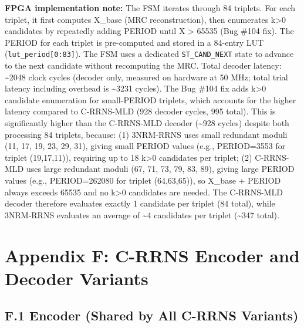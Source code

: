 \documentclass[
  12pt,
  a4paper]{report}
\begin{document}
\textbf{FPGA implementation note:} The FSM iterates through 84 triplets.
For each triplet, it first computes X\_base (MRC reconstruction), then
enumerates k\textgreater0 candidates by repeatedly adding PERIOD until X
\textgreater{} 65535 (Bug \#104 fix). The PERIOD for each triplet is
pre-computed and stored in a 84-entry LUT
(\texttt{lut\_period{[}0:83{]}}). The FSM uses a dedicated
\texttt{ST\_CAND\_NEXT} state to advance to the next candidate without
recomputing the MRC. Total decoder latency: \textasciitilde2048 clock
cycles (decoder only, measured on hardware at 50 MHz; total trial
latency including overhead is \textasciitilde3231 cycles). The Bug \#104
fix adds k\textgreater0 candidate enumeration for small-PERIOD triplets,
which accounts for the higher latency compared to C-RRNS-MLD (928
decoder cycles, 995 total). This is significantly higher than the
C-RRNS-MLD decoder (\textasciitilde928 cycles) despite both processing
84 triplets, because: (1) 3NRM-RRNS uses small redundant moduli (11, 17,
19, 23, 29, 31), giving small PERIOD values (e.g., PERIOD=3553 for
triplet (19,17,11)), requiring up to 18 k\textgreater0 candidates per
triplet; (2) C-RRNS-MLD uses large redundant moduli (67, 71, 73, 79, 83,
89), giving large PERIOD values (e.g., PERIOD=262080 for triplet
(64,63,65)), so X\_base + PERIOD always exceeds 65535 and no
k\textgreater0 candidates are needed. The C-RRNS-MLD decoder therefore
evaluates exactly 1 candidate per triplet (84 total), while 3NRM-RRNS
evaluates an average of \textasciitilde4 candidates per triplet
(\textasciitilde347 total).

\section{Appendix F: C-RRNS Encoder and Decoder
Variants}\label{appendix-f-c-rrns-encoder-and-decoder-variants}

\subsection{F.1 Encoder (Shared by All C-RRNS
Variants)}\label{f.1-encoder-shared-by-all-c-rrns-variants}
\end{document}
